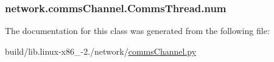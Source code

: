 \subsubsection[{num}]{\setlength{\rightskip}{0pt plus 5cm}network.\+comms\+Channel.\+Comms\+Thread.\+num}\label{classnetwork_1_1commsChannel_1_1CommsThread_a2201049bdb76e1bff371c2ef1446eeb6}


The documentation for this class was generated from the following file\+:\begin{DoxyCompactItemize}
\item 
build/lib.\+linux-\/x86\+\_-\/2./network/\hyperlink{build_2lib_8linux-x86__64-2_87_2network_2commsChannel_8py}{comms\+Channel.\+py}\end{DoxyCompactItemize}
